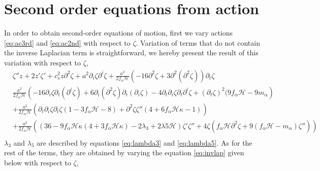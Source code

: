 \documentclass[12pt,a4paper]{article}
\numberwithin{equation}{section}
\numberwithin{equation}{section}
\begin{document}
\section{Second order equations from action} \label{app:second order equations}
In order to obtain second-order equations of motion, first we vary actions \eqref{eq:ac3rd} and \eqref{eq:ac2nd} with respect to $\zeta$. Variation of terms that do not contain the inverse Laplacian term is straightforward, we hereby present the result of this variation with respect to $\zeta$,
\begin{equation}
\begin{split}
    &\zeta'' z + 2  z' \zeta' + c_s^2  z \partial^2 \zeta + a^2 \partial_i\zeta \partial^i \zeta+\frac{a^2}{2f_{\alpha}\mathcal{H}}\left(-16\partial^2 \zeta+3\partial^2(\partial^2\zeta) \right) \partial_t \zeta \\
    & \frac{a^2}{2f_{\alpha}\mathcal{\mathcal{\mathcal{H}}}}\left(-16\partial_i \zeta \partial_t(\partial^i\zeta)+6\partial_i(\partial^2\zeta) \partial_t(\partial_i\zeta)-4\partial_t\partial_i\zeta \partial_t\partial^i\zeta +(\partial_t\zeta)^2(9f_{\alpha}\mathcal{H}-9m_{\alpha}\right)\\
    &+ \frac{a^2}{2f_{\alpha}\mathcal{H}} \left( \partial_t \partial_i \zeta \partial_t \zeta(1-3f_{\alpha}\mathcal{H}-8)+\partial^2 \zeta \zeta'' (4+6f_{\alpha}\mathcal{H}\kappa-1) \right)\\
    &+ \frac{a^2}{2f_{\alpha}\mathcal{H}}\left((36-9f_{\alpha}\mathcal{H}\kappa(4+3f_{\alpha}\mathcal{H}\kappa)-2\lambda_3+2\lambda 5 \mathcal{H}) \zeta'\zeta''+4\zeta( f_{\alpha}\mathcal{H}\partial^2\zeta +9(f_{\alpha}\mathcal{H}-m_{\alpha}) \zeta'' ) \right)\\
\end{split}
\end{equation}
$\lambda_3$ and $\lambda_5$ are described by equations \eqref{eq:lambda3} and \eqref{eq:lambda5}. 
As for the rest of the terms, they are obtained by varying the equation \eqref{eq:invlap} given below with respect to $\zeta$,
\end{document}
